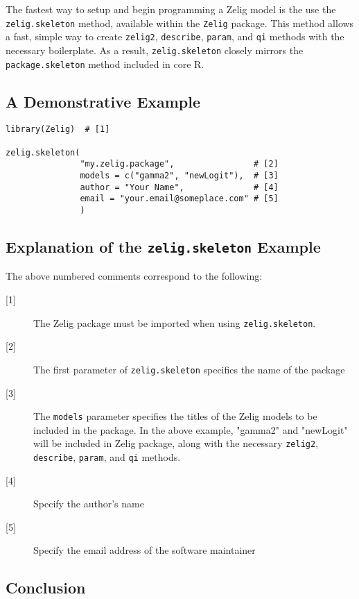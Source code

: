 \documentclass{article}
\newcommand{\code}[1]{{\tt #1}}
\begin{document}
The fastest way to setup and begin programming a Zelig model is the use the \code{zelig.skeleton} method, available within the \code{Zelig} package. This method allows a fast, simple way to create \code{zelig2}, \code{describe}, \code{param}, and \code{qi} methods with the necessary boilerplate. As a result, \code{zelig.skeleton} closely mirrors the \code{package.skeleton} method included in core R.

\subsection{A Demonstrative Example}

\begin{verbatim}
library(Zelig)  # [1]

zelig.skeleton(
               "my.zelig.package",                # [2]
               models = c("gamma2", "newLogit"),  # [3]
               author = "Your Name",              # [4]
               email = "your.email@someplace.com" # [5]
               )
\end{verbatim}

\subsection{Explanation of the \code{zelig.skeleton} Example}

The above numbered comments correspond to the following:

\begin{description}
	\item[{[1]}] The Zelig package must be imported when using \code{zelig.skeleton}.
	\item[{[2]}] The first parameter of \code{zelig.skeleton} specifies the name of the package
	\item[{[3]}] The \code{models} parameter specifies the titles of the Zelig models to be included in the package. In the above example, "gamma2" and "newLogit" will be included in Zelig package, along with the necessary \code{zelig2}, \code{describe}, \code{param}, and \code{qi} methods.
	\item[{[4]}] Specify the author's name
	\item[{[5]}] Specify the email address of the software maintainer
\end{description}

\subsection{Conclusion}
\end{document}
